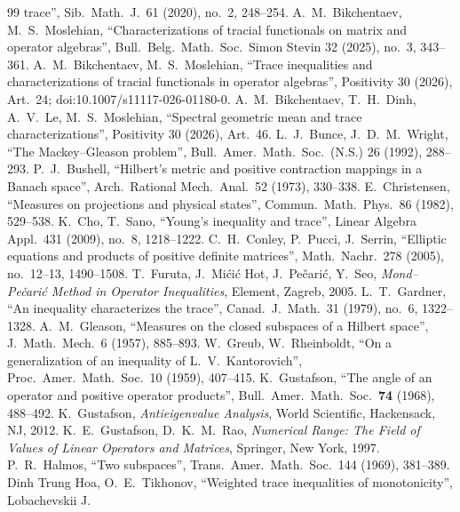 \documentclass[11pt]{article}
\theoremstyle{plain}
\theoremstyle{definition}
\theoremstyle{remark}
\begin{document}
{\begin{thebibliography}{99}
  trace'', Sib.\ Math.\ J.\ 61 (2020), no.~2, 248--254.
 A.~M.~Bikchentaev, M.~S.~Moslehian, ``Characterizations of tracial functionals on
  matrix and operator algebras'', Bull.\ Belg.\ Math.\ Soc.\ Simon Stevin 32 (2025), no.~3, 343--361.
 A.~M.~Bikchentaev, M.~S.~Moslehian, ``Trace inequalities and characterizations
  of tracial functionals in operator algebras'', Positivity 30 (2026), Art.~24; doi:10.1007/s11117-026-01180-0.
 A.~M.~Bikchentaev, T.~H.~Dinh, A.~V.~Le, M.~S.~Moslehian, ``Spectral geometric mean
  and trace characterizations'', Positivity 30 (2026), Art.~46.
 L.~J.~Bunce, J.~D.~M.~Wright, ``The Mackey--Gleason problem'', Bull.\ Amer.\ Math.\ Soc.\ (N.S.) 26
  (1992), 288--293.
 P.~J.~Bushell, ``Hilbert's metric and positive contraction mappings in a Banach space'',
  Arch.\ Rational Mech.\ Anal.\ 52 (1973), 330--338.
 E.~Christensen, ``Measures on projections and physical states'', Commun.\ Math.\ Phys.\ 86
  (1982), 529--538.
 K.~Cho, T.~Sano, ``Young's inequality and trace'', Linear Algebra Appl.\ 431 (2009), no.~8,
  1218--1222.
 C.~H.~Conley, P.~Pucci, J.~Serrin, ``Elliptic equations and products of positive definite
  matrices'', Math.\ Nachr.\ 278 (2005), no.~12--13, 1490--1508.
 T.~Furuta, J.~Mi\'ci\'c Hot, J.~Pe\v{c}ari\'c, Y.~Seo, \emph{Mond--Pe\v{c}ari\'c Method in Operator
  Inequalities}, Element, Zagreb, 2005.
 L.~T.~Gardner, ``An inequality characterizes the trace'', Canad.\ J.\ Math.\ 31
  (1979), no.~6, 1322--1328.
 A.~M.~Gleason, ``Measures on the closed subspaces of a Hilbert space'', J.\ Math.\ Mech.\ 6 (1957),
  885--893.
 W.~Greub, W.~Rheinboldt, ``On a generalization of an inequality of L.~V.~Kantorovich'', Proc.\
  Amer.\ Math.\ Soc.\ 10 (1959), 407--415.
 K.~Gustafson, ``The angle of an operator and positive operator products'', Bull.\ Amer.\
Math.\ Soc.\ \textbf{74} (1968), 488--492.
\bibitem{gustafson2012} K.~Gustafson, \emph{Antieigenvalue Analysis}, World Scientific, Hackensack, NJ, 2012.
\bibitem{gustafsonrao1997} K.~E.~Gustafson, D.~K.~M.~Rao, \emph{Numerical Range: The Field of Values of Linear
Operators and Matrices}, Springer, New York, 1997.
\bibitem{halmos1969} P.~R.~Halmos, ``Two subspaces'', Trans.\ Amer.\ Math.\ Soc.\ 144 (1969), 381--389.
\bibitem{hoa2007} Dinh Trung Hoa, O.~E.~Tikhonov, ``Weighted trace inequalities of monotonicity'', Lobachevskii J.\

\end{thebibliography}}
\end{document}
